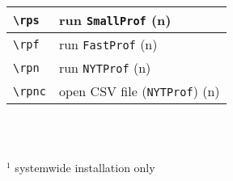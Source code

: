 \documentclass[oneside,10pt,landscape,DIV17]{scrartcl}
\begin{document}
\begin{multicols}{3}
\begin{center}
\begin{tabular}[]{|p{11mm}|p{58mm}|}
\hline \verb'\rps'    & run \verb'SmallProf'            \hfill (n)\\
\hline \verb'\rpf'    & run \verb'FastProf'             \hfill (n)\\
\hline \verb'\rpn'    & run \verb'NYTProf'              \hfill (n)\\
\hline \verb'\rpnc'   & open CSV file (\verb'NYTProf')  \hfill (n)\\
\hline
\end{tabular}\\
%
\begin{minipage}[b]{75mm}%
\scriptsize{%
\vspace{10mm}
\hrulefill\\
$^1$ {systemwide installation only}\\
}%
\end{minipage}\\
%
\end{center}%
\end{multicols}%
%
\newpage
%
%
\end{document}
